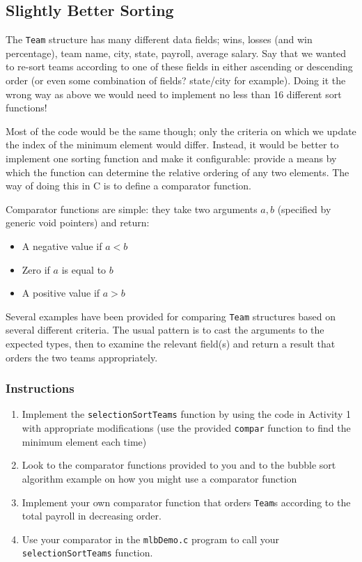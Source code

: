 \documentclass[12pt]{scrartcl}
\begin{document}
\subsection{Slightly Better Sorting}

The \texttt{Team} structure has many different data fields; 
wins, losses (and win percentage), team name, city, state, payroll, 
average salary.  Say that we wanted to re-sort teams according to 
one of these fields in either ascending or descending order (or even 
some combination of fields? state/city for example).  Doing it the 
wrong way as above we would need to implement no less than 
16 different sort functions!

Most of the code would be the same though; only the criteria on 
which we update the index of the minimum element would differ.  
Instead, it would be better to implement one sorting function and 
make it configurable: provide a means by which the function can 
determine the relative ordering of any two elements.  The way of 
doing this in C is to define a comparator function.

Comparator functions are simple: they take two arguments 
$a, b$ (specified by generic void pointers) and return:
\begin{itemize}
  \item A negative value if $a < b$ 
  \item Zero if $a$ is equal to $b$
  \item A positive value if $a > b$
\end{itemize}
Several examples have been provided for comparing \texttt{Team} 
structures based on several different criteria.  The usual pattern 
is to cast the arguments to the expected types, then to examine 
the relevant field(s) and return a result that orders the two teams 
appropriately.

\subsubsection*{Instructions}

\begin{enumerate}
  \item Implement the \texttt{selectionSortTeams} function 
	by using the code in Activity 1 with appropriate modifications 
	(use the provided \texttt{compar} function to find the 
	minimum element each time)
  \item Look to the comparator functions provided to you and to the 
	bubble sort algorithm example on how you might use a comparator 
	function
  \item Implement your own comparator function that orders \texttt{Team}s 
	according to the total payroll in decreasing order.
  \item Use your comparator in the \texttt{mlbDemo.c} program 
	to call your \texttt{selectionSortTeams} function.
\end{enumerate}
	
\end{document}
